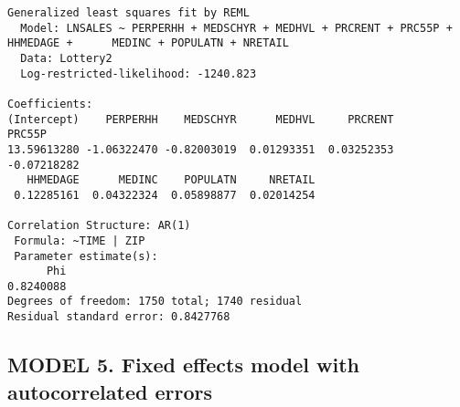 \documentclass[]{book}
\newenvironment{Shaded}{\begin{snugshade}}{\end{snugshade}}
\newcommand{\DataTypeTok}[1]{\textcolor[rgb]{0.13,0.29,0.53}{#1}}
\newcommand{\KeywordTok}[1]{\textcolor[rgb]{0.13,0.29,0.53}{\textbf{#1}}}
\newcommand{\NormalTok}[1]{#1}
\newcommand{\OperatorTok}[1]{\textcolor[rgb]{0.81,0.36,0.00}{\textbf{#1}}}
\begin{document}
\begin{verbatim}
Generalized least squares fit by REML
  Model: LNSALES ~ PERPERHH + MEDSCHYR + MEDHVL + PRCRENT + PRC55P + HHMEDAGE +      MEDINC + POPULATN + NRETAIL 
  Data: Lottery2 
  Log-restricted-likelihood: -1240.823

Coefficients:
(Intercept)    PERPERHH    MEDSCHYR      MEDHVL     PRCRENT      PRC55P 
13.59613280 -1.06322470 -0.82003019  0.01293351  0.03252353 -0.07218282 
   HHMEDAGE      MEDINC    POPULATN     NRETAIL 
 0.12285161  0.04322324  0.05898877  0.02014254 

Correlation Structure: AR(1)
 Formula: ~TIME | ZIP 
 Parameter estimate(s):
      Phi 
0.8240088 
Degrees of freedom: 1750 total; 1740 residual
Residual standard error: 0.8427768 
\end{verbatim}

\hypertarget{model-5.-fixed-effects-model-with-autocorrelated-errors}{%
\subsection{MODEL 5. Fixed effects model with autocorrelated errors}\label{model-5.-fixed-effects-model-with-autocorrelated-errors}}

\begin{Shaded}
\end{Shaded}
\end{document}
